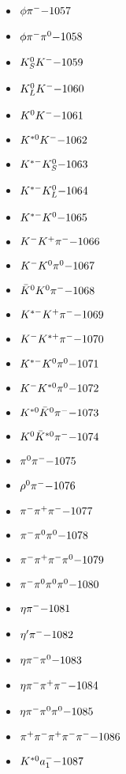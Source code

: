 \begin{multicols}{3}
\begin{itemize}
 \item $ \phi \pi^{-} \hfill{-1057}$
 \item $ \phi \pi^{-} \pi^{0} \hfill{-1058}$
 \item $ K_{S}^{0} K^{-} \hfill{-1059}$
 \item $ K_{L}^{0} K^{-} \hfill{-1060}$
 \item $ K^{0} K^{-} \hfill{-1061}$
 \item $ K^{*0} K^{-} \hfill{-1062}$
 \item $ K^{*-} K_{S}^{0} \hfill{-1063}$
 \item $ K^{*-} K_{L}^{0} \hfill{-1064}$
 \item $ K^{*-} K^{0} \hfill{-1065}$
 \item $ K^{-} K^{+} \pi^{-} \hfill{-1066}$
 \item $ K^{-} K^{0} \pi^{0} \hfill{-1067}$
 \item $ \bar{K}^{0} K^{0} \pi^{-} \hfill{-1068}$
 \item $ K^{*-} K^{+} \pi^{-} \hfill{-1069}$
 \item $ K^{-} K^{*+} \pi^{-} \hfill{-1070}$
 \item $ K^{*-} K^{0} \pi^{0} \hfill{-1071}$
 \item $ K^{-} K^{*0} \pi^{0} \hfill{-1072}$
 \item $ K^{*0} \bar{K}^{0} \pi^{-} \hfill{-1073}$
 \item $ K^{0} \bar{K}^{*0} \pi^{-} \hfill{-1074}$
 \item $ \pi^{0} \pi^{-} \hfill{-1075}$
 \item $ \rho^{0} \pi^{-} \hfill{-1076}$
 \item $ \pi^{-} \pi^{+} \pi^{-} \hfill{-1077}$
 \item $ \pi^{-} \pi^{0} \pi^{0} \hfill{-1078}$
 \item $ \pi^{-} \pi^{+} \pi^{-} \pi^{0} \hfill{-1079}$
 \item $ \pi^{-} \pi^{0} \pi^{0} \pi^{0} \hfill{-1080}$
 \item $ \eta \pi^{-} \hfill{-1081}$
 \item $ {\eta^{\prime}} \pi^{-} \hfill{-1082}$
 \item $ \eta \pi^{-} \pi^{0} \hfill{-1083}$
 \item $ \eta \pi^{-} \pi^{+} \pi^{-} \hfill{-1084}$
 \item $ \eta \pi^{-} \pi^{0} \pi^{0} \hfill{-1085}$
 \item $ \pi^{+} \pi^{-} \pi^{+} \pi^{-} \pi^{-} \hfill{-1086}$
 \item $ K^{*0} a_{1}^{-} \hfill{-1087}$

\end{itemize}
\end{multicols}
